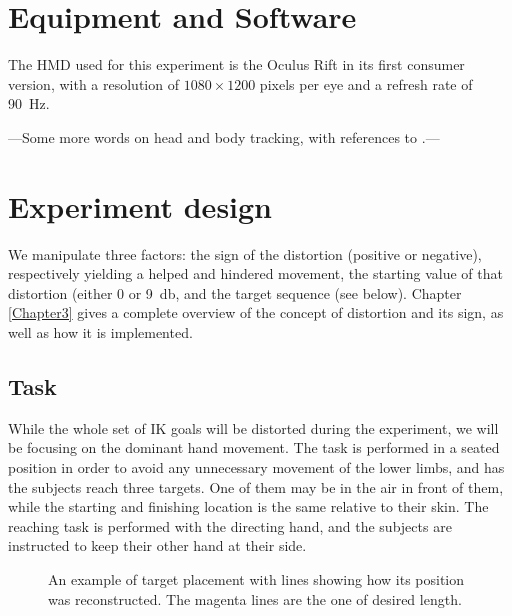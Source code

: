 \section{Equipment and Software}

The HMD used for this experiment is the Oculus Rift in its first consumer version, with a resolution of $1080 \times 1200$ pixels per eye and a refresh rate of \SI{90}{\hertz}.

---Some more words on head and body tracking, with references to \cite{molla2013singularity}.---

\section{Experiment design}

We manipulate three factors: the sign of the distortion (positive or negative), respectively yielding a helped and hindered movement, the starting value of that distortion (either \num{0} or \SI{9}{\decibel}, and the target sequence (see below). Chapter \ref{Chapter3} gives a complete overview of the concept of distortion and its sign, as well as how it is implemented.

\subsection{Task}
\label{sec:task}
While the whole set of IK goals will be distorted during the experiment, we will be focusing on the dominant hand movement. The task is performed in a seated position in order to avoid any unnecessary movement of the lower limbs, and has the subjects reach three targets. One of them may be in the air in front of them, while the starting and finishing location is the same relative to their skin. The reaching task is performed with the directing hand, and the subjects are instructed to keep their other hand at their side.

\begin{figure}
    \caption{An example of target placement with lines showing how its position was reconstructed. The magenta lines are the one of desired length.}\label{fig:targetPlacement}
\end{figure}

